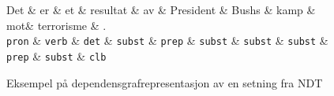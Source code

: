 \begin{figure}
    \smaller[2.5]
    \begin{dependency}[]
        \begin{deptext}[column sep=1em, row sep=.1ex]
            Det \& er \& et \& resultat \& av \& President \& Bushs \& kamp \&
            mot\& terrorisme \& . \\
            \texttt{pron} \& \texttt{verb} \& \texttt{det} \&
            \texttt{subst} \& \texttt{prep} \& \texttt{subst} \&
            \texttt{subst} \& \texttt{subst} \& \texttt{prep} \&
            \texttt{subst} \& \texttt{clb}  \\
        \end{deptext}
    \end{dependency}
    \caption{Eksempel på dependensgrafrepresentasjon av en setning fra NDT}
    \label{exndt}
\end{figure}